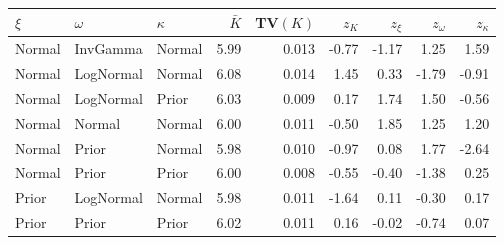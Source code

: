 \begin{tabular}{l l l r r r r r r}
  \toprule
  $\xi$ & $\omega$ & $\kappa$ & $\bar{K}$ & TV$(K)$ & $z_K$ & $z_\xi$ & $z_\omega$ & $z_\kappa$ \\
  \midrule
  Normal & InvGamma & Normal & 5.99 & 0.013 & -0.77 & -1.17 & 1.25 & 1.59 \\
  Normal & LogNormal & Normal & 6.08 & 0.014 & 1.45 & 0.33 & -1.79 & -0.91 \\
  Normal & LogNormal & Prior & 6.03 & 0.009 & 0.17 & 1.74 & 1.50 & -0.56 \\
  Normal & Normal & Normal & 6.00 & 0.011 & -0.50 & 1.85 & 1.25 & 1.20 \\
  Normal & Prior & Normal & 5.98 & 0.010 & -0.97 & 0.08 & 1.77 & -2.64 \\
  Normal & Prior & Prior & 6.00 & 0.008 & -0.55 & -0.40 & -1.38 & 0.25 \\
  Prior & LogNormal & Normal & 5.98 & 0.011 & -1.64 & 0.11 & -0.30 & 0.17 \\
  Prior & Prior & Prior & 6.02 & 0.011 & 0.16 & -0.02 & -0.74 & 0.07 \\
  \bottomrule
\end{tabular}
